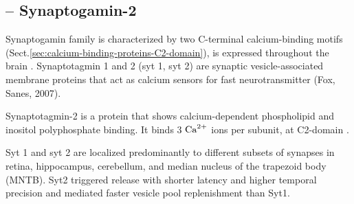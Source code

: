 \subsection{-- Synaptogamin-2}
\label{sec:synaptogamin-2}

Synaptogamin family is characterized by two C-terminal calcium-binding motifs
(Sect.\ref{sec:calcium-binding-proteins-C2-domain}), is expressed throughout the
brain .
Synaptotagmin 1 and 2 (syt 1, syt 2) are synaptic vesicle-associated membrane
proteins that act as calcium sensors for fast neurotransmitter (Fox, Sanes,
2007).

Synaptotagmin-2  is a protein that shows calcium-dependent phospholipid and
inositol polyphosphate binding. It binds 3 ${\text{Ca}^{2+}}$ ions per subunit, at
C2-domain .

Syt 1 and syt 2 are localized predominantly to different subsets of
synapses in retina, hippocampus, cerebellum, and median nucleus of the trapezoid
body (MNTB). Syt2 triggered release with shorter latency and higher temporal
precision and mediated faster vesicle pool replenishment than Syt1.

